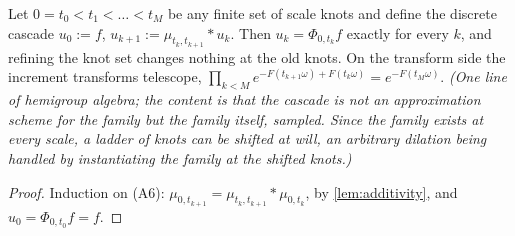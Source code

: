 \begin{proposition}\label{prop:knot-exactness}
Let $0 = t_0 < t_1 < \dots < t_M$ be any finite set of scale knots and define the discrete
cascade $u_0 := f$, $u_{k+1} := \mu_{t_k,t_{k+1}} * u_k$. Then $u_k = \Phi_{0,t_k}f$ exactly for
every $k$, and refining the knot set changes nothing at the old knots. On the transform side the
increment transforms telescope,
$\prod_{k<M} e^{-F(t_{k+1}\omega) + F(t_k\omega)} = e^{-F(t_M\omega)}$.
\statusT\quad\emph{(One line of hemigroup algebra; the content is that the cascade is not an
approximation scheme for the family but the family itself, sampled. Since the family exists at
every scale, a ladder of knots can be shifted at will, an arbitrary dilation being handled by
instantiating the family at the shifted knots.)}
\end{proposition}

\begin{proof}
Induction on (A6): $\mu_{0,t_{k+1}} = \mu_{t_k,t_{k+1}} * \mu_{0,t_k}$, by
\ref{lem:additivity}, and $u_0 = \Phi_{0,t_0}f = f$.
\end{proof}

